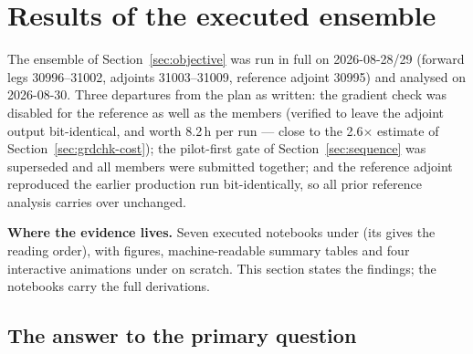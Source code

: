 %

\section{Results of the executed ensemble}
\label{sec:results}

The ensemble of Section~\ref{sec:objective} was run in full on
2026-08-28/29 (forward legs 30996--31002, adjoints 31003--31009, reference
adjoint 30995) and analysed on 2026-08-30. Three departures from the plan as
written: the gradient check was disabled for the reference as well as the
members (verified to leave the adjoint output bit-identical, and worth
8.2\,h per run --- close to the 2.6$\times$ estimate of
Section~\ref{sec:grdchk-cost}); the pilot-first gate of
Section~\ref{sec:sequence} was superseded and all members were submitted
together; and the reference adjoint reproduced the earlier production run
bit-identically, so all prior reference analysis carries over unchanged.

\begin{callout}
\textbf{Where the evidence lives.} Seven executed notebooks under
\allowbreak{}
(its  gives the reading order), with figures, machine-readable
summary tables and four interactive animations under
 on scratch. This section states the
findings; the notebooks carry the full derivations.
\end{callout}

\subsection{The answer to the primary question}
\label{sec:results-answer}

